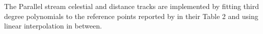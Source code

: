 The Parallel stream celestial and distance tracks are implemented by fitting third degree polynomials to the reference points reported by \citet{Weiss2018} in their Table 2 and using linear interpolation in between.
